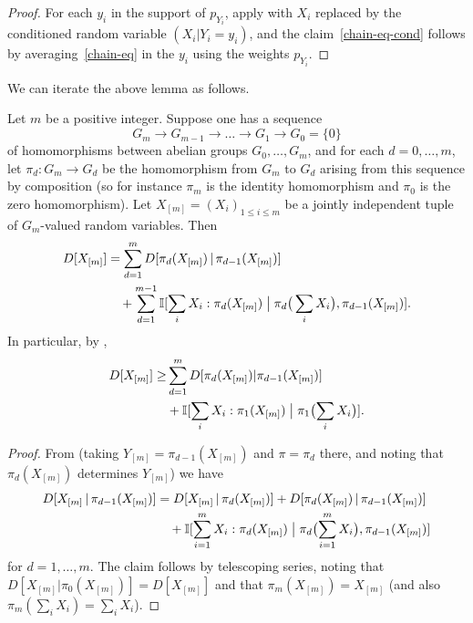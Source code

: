   \begin{proof}\leanok
  For each $y_i$ in the support of $p_{Y_i}$, apply  with $X_i$ replaced by the conditioned random variable $(X_i|Y_i=y_i)$, and the claim~\eqref{chain-eq-cond} follows by averaging~\eqref{chain-eq} in the $y_i$ using the weights $p_{Y_i}$.
  \end{proof}

  We can iterate the above lemma as follows.

  \begin{lemma}\label{multidist-chain-rule-iter}\leanok  Let $m$ be a positive integer.
    Suppose one has a sequence
    \begin{equation}\label{g-seq}
      G_m \to G_{m-1} \to \dots \to G_1 \to G_0 = \{0\}
    \end{equation}
    of homomorphisms between abelian groups $G_0,\dots,G_m$, and for each $d=0,\dots,m$, let $\pi_d : G_m \to G_d$ be the homomorphism from $G_m$ to $G_d$ arising from this sequence by composition (so for instance $\pi_m$ is the identity homomorphism and $\pi_0$ is the zero homomorphism).
    Let $X_{[m]} = (X_i)_{1 \leq i \leq m}$ be a jointly independent tuple of $G_m$-valued random variables.
    Then
    \begin{equation}
      \begin{split}
        D[ X_{[m]} ] &=  \sum_{d=1}^m D[ \pi_d(X_{[m]}) \,|\, \pi_{d-1}(X_{[m]})] \\
         &\quad + \sum_{d=1}^{m-1} \mathbb{I}[ \sum_i X_i : \pi_d(X_{[m]}) \; \big| \; \pi_d\big(\sum_i X_i\big), \pi_{d-1}(X_{[m]}) ].
      \end{split}\label{chain-eq-cond'}
    \end{equation}
    In particular, by ,
    \begin{align}\nonumber
        D[ X_{[m]} ] \geq  & \sum_{d=1}^m D[ \pi_d(X_{[m]})|\pi_{d-1}(X_{[m]}) ] \\
         & + \mathbb{I}[ \sum_i X_i : \pi_1(X_{[m]}) \; \big| \; \pi_1\bigl(\sum_i X_i\bigr) ].\label{chain-eq-cond''}
    \end{align}
  \end{lemma}

  \begin{proof}\leanok
  From  (taking $Y_{[m]} = \pi_{d-1}(X_{[m]})$ and $\pi = \pi_d$ there, and noting that $\pi_d(X_{[m]})$ determines $Y_{[m]}$) we have
  \begin{align*}
    D[ X_{[m]} \,|\, \pi_{d-1}(X_{[m]}) ] &=  D[ X_{[m]} \,|\, \pi_d(X_{[m]}) ] + D[  \pi_d(X_{[m]})\,|\,\pi_{d-1}(X_{[m]}) ] \\
                                             &\quad + \mathbb{I}[ \sum_{i=1}^m X_i : \pi_d(X_{[m]}) \; \big| \; \pi_d\bigl(\sum_{i=1}^m X_i\bigr), \pi_{d-1}(X_{[m]}) ]
  \end{align*}
  for $d=1,\dots,m$. The claim follows by telescoping series, noting that $D[X_{[m]} | \pi_0(X_{[m]})] = D[X_{[m]}]$ and that $\pi_m(X_{[m]})=X_{[m]}$ (and also $\pi_m( \sum_i X_i ) = \sum_i X_i$).
  \end{proof}

